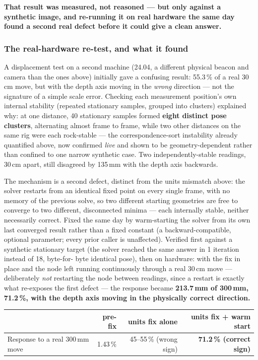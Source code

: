 \documentclass[11pt]{article}
\begin{document}
\textbf{That result was measured, not reasoned --- but only against a
synthetic image, and re-running it on real hardware the same day found a
second real defect before it could give a clean answer.}

\subsubsection*{The real-hardware re-test, and what it found}

A displacement test on a second machine (24.04, a different physical beacon
and camera than the ones above) initially gave a confusing result: 55.3\,\%
of a real 30\,cm move, but with the depth axis moving in the \emph{wrong}
direction --- not the signature of a simple scale error. Checking each
measurement position's own internal stability (repeated stationary samples,
grouped into clusters) explained why: at one distance, 40 stationary samples
formed \textbf{eight distinct pose clusters}, alternating almost frame to
frame, while two other distances on the same rig were each rock-stable ---
the correspondence-sort instability already quantified above, now confirmed
\emph{live} and shown to be geometry-dependent rather than confined to one
narrow synthetic case. Two independently-stable readings, 30\,cm apart,
still disagreed by 135\,mm with the depth axis backwards.

The mechanism is a second defect, distinct from the units mismatch above:
the solver restarts from an identical fixed point on every single frame,
with no memory of the previous solve, so two different starting geometries
are free to converge to two different, disconnected minima --- each
internally stable, neither necessarily correct. Fixed the same day by
warm-starting the solver from its own last converged result rather than a
fixed constant (a backward-compatible, optional parameter; every prior
caller is unaffected). Verified first against a synthetic stationary target
(the solver reached the same answer in 1 iteration instead of 18, byte-for-
byte identical pose), then on hardware: with the fix in place and the node
left running continuously through a real 30\,cm move --- deliberately
\emph{not} restarting the node between readings, since a restart is exactly
what re-exposes the first defect --- the response became \textbf{213.7\,mm
of 300\,mm, 71.2\,\%, with the depth axis moving in the physically correct
direction.}

\begin{center}
\begin{tabular}{@{}lrrr@{}}
\toprule
 & pre-fix & units fix alone & units fix + warm start \\
\midrule
Response to a real 300\,mm move & 1.43\,\% & 45--55\,\% (wrong sign) & \textbf{71.2\,\% (correct sign)} \\
\bottomrule
\end{tabular}
\end{center}
\end{document}
